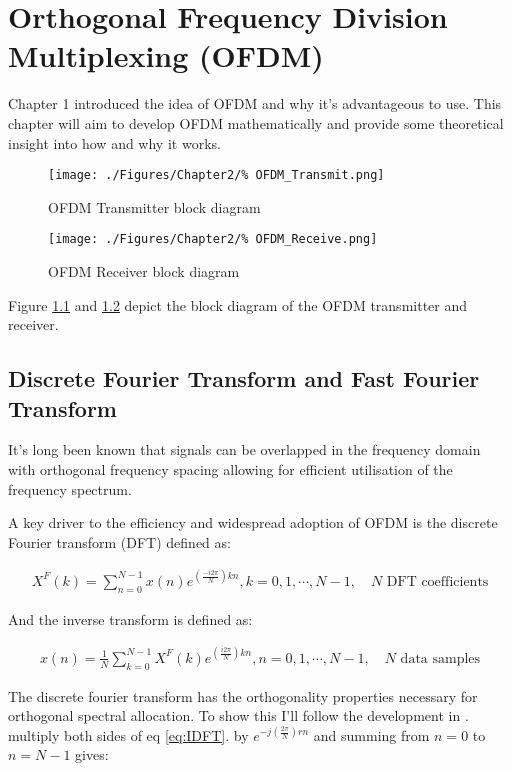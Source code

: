 \chapter{Orthogonal Frequency Division Multiplexing (OFDM)}
\label{chap:OFDM}
\newpage
Chapter 1 introduced the idea of OFDM and why it's %
advantageous to use. This chapter will aim to develop %
OFDM mathematically and provide some theoretical insight %
into how and why it works.
\begin{figure}[ht]
	\centering
	\texttt{[image: ./Figures/Chapter2/\%
	OFDM\_Transmit.png]}
	\caption{OFDM Transmitter block diagram}
	\label{fig:OFDMTransmit}
\end{figure}

\begin{figure}[ht]
	\centering
	\texttt{[image: ./Figures/Chapter2/\%
	OFDM\_Receive.png]}
	\caption{OFDM Receiver block diagram}
	\label{fig:OFDMReceiver}
\end{figure}

Figure \ref{fig:OFDMTransmit} and \ref{fig:OFDMReceiver} %
depict the block diagram of the OFDM transmitter and receiver.

\section{Discrete Fourier Transform and Fast Fourier Transform}

It's long been known that signals can be overlapped in the %
frequency domain with orthogonal frequency spacing %
allowing for efficient utilisation of the %
frequency spectrum\cite{Chang66}.

A key driver to the efficiency and widespread adoption %
of OFDM is the discrete Fourier transform (DFT) defined %
as\cite{Rao2010}:

\begin{align}
	X^F(k) = \sum_{n=0}^{N-1}x(n)e^{(\frac{-i 2\pi}{N})kn}, %
	k=0,1,\cdots,N-1,\quad N \text{ DFT coefficients}
\end{align}

And the inverse transform is defined as:

\begin{align}
	x(n) = \frac{1}{N}\sum_{k=0}^{N-1}X^{F}(k)%
	e^{(\frac{i 2\pi}{N})kn}, n = 0,1,\cdots,N-1, \quad%
	N \text{ data samples}
	\label{eq:IDFT}
\end{align}

The discrete fourier transform has the orthogonality %
properties necessary for orthogonal spectral allocation. %
To show this I'll follow the development in \cite{Opp99}. %
multiply both sides of eq \ref{eq:IDFT}. by %
$e^{-j(\frac{2\pi}{N})rn}$ and summing from $n=0$ %
to $n=N-1$ gives:

